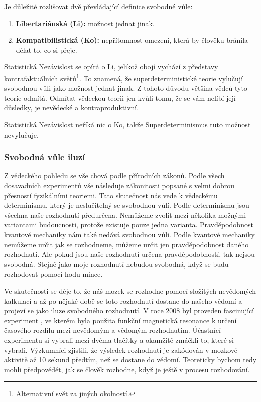 Je důležité rozlišovat dvě převládající definice svobodné vůle:
\begin{enumerate}
    \item \textbf{Libertariánská (Li):} možnost jednat jinak.
    \item \textbf{Kompatibilistická (Ko):} nepřítomnost omezení, která by člověku bránila dělat to, co si přeje.
\end{enumerate}

Statistická Nezávislost se opírá o Li, jelikož obojí vychází z představy kontrafaktuálních světů\footnote[13]{Alternativní svět za jiných okolností.}. To znamená, že superdeterministické teorie vylučují svobodnou vůli jako možnost jednat jinak. Z tohoto důvodu většina vědců tyto teorie odmítá. Odmítat vědeckou teorii jen kvůli tomu, že se vám nelíbí její důsledky, je nevědecké a kontraproduktivní.

Statistická Nezávislost neříká nic o Ko, takže Superdeterminismus tuto možnost nevylučuje.

\subsubsection{Svobodná vůle iluzí}
Z vědeckého pohledu se vše chová podle přírodních zákonů. Podle všech dosavadních experimentů vše následuje zákonitosti popsané s velmi dobrou přesností fyzikálními teoriemi. Tato skutečnost nás vede k vědeckému determinismu, který je neslučitelný se svobodnou vůlí. Podle determinismu jsou všechna naše rozhodnutí předurčena. Nemůžeme zvolit mezi několika možnými variantami budoucnosti, protože existuje pouze jedna varianta. Pravděpodobnost kvantové mechaniky nám také nedává svobodnou vůli. Podle kvantové mechaniky nemůžeme určit jak se rozhodneme, můžeme určit jen pravděpodobnost daného rozhodnutí. Ale pokud jsou naše rozhodnutí určena pravděpodobností, tak nejsou svobodná. Stejně jako moje rozhodnutí nebudou svobodná, když se budu rozhodovat pomocí hodu mince.

Ve skutečnosti se děje to, že náš mozek se rozhodne pomocí složitých nevědomých kalkulací a až po nějaké době se toto rozhodnutí dostane do našeho vědomí a projeví se jako iluze svobodného rozhodnutí. V roce 2008 byl proveden fascinující experiment \parencite{DecisionDet}, ve kterém byla použita funkční magnetická resonance k určení časového rozdílu mezi nevědomým a vědomým rozhodnutím. Účastnící experimentu si vybrali mezi dvěma tlačítky a okamžitě zmáčkli to, které si vybrali. Výzkumníci zjistili, že výsledek rozhodnutí je zakódován v mozkové aktivitě až 10 sekund předtím, než se dostane do vědomí. Teoreticky bychom tedy mohli předpovědět, jak se člověk rozhodne, když je ještě v procesu rozhodování.

